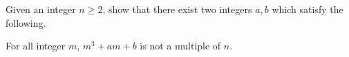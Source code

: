 Given an integer $n\ge 2$, show that there exist two integers $a,b$ which satisfy the following.

For all integer $m$, $m^3+am+b$ is not a multiple of $n$.